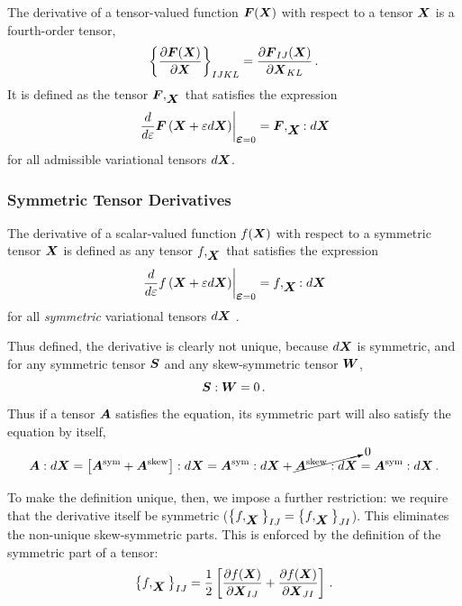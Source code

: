 \documentclass[10pt,letterpaper,oneside]{report}
\newcommand{\ten}[1]{\mbox{\boldmath $#1$}{}}
\newcommand{\scas}[1]{\mbox{{\scriptsize{${\rm{#1}}$}}}{}}
\begin{document}
The derivative of a tensor-valued function $ \ten{F} ( \ten{X} )$ with respect to a tensor $\ten{X}$ is a fourth-order tensor, 
\begin{equation}
\left\lbrace \frac{\partial \ten{F} ( \ten{X} ) }{\partial \ten{X}} \right\rbrace_{IJKL} = \frac{\partial \ten{F}_{IJ} ( \ten{X} ) }{\partial \ten{X}_{KL}} \, .
\end{equation}
It is defined as the tensor $\ten{F},_{\ten{X}}$ that satisfies the expression
\begin{equation}
\left. \frac{d}{d \varepsilon} \ten{F} \left( \ten{X} + \varepsilon d\ten{X} \right) \right|_{\ten{\varepsilon}=0} = \ten{F},_{\ten{X}} : d \ten{X}
\end{equation}
for all admissible variational tensors $d \ten{X}$. 

\subsubsection{Symmetric Tensor Derivatives}
The derivative of a scalar-valued function $f ( \ten{X} )$ with respect to a symmetric tensor $\ten{X}$ is defined as any tensor $f,_{\ten{X}}$ that satisfies the expression
\begin{equation}
\left. \frac{d}{d \varepsilon} f \left( \ten{X} + \varepsilon d\ten{X} \right) \right|_{\ten{\varepsilon}=0} = f,_{\ten{X}} : d \ten{X}
\end{equation}
for all \textit{symmetric} variational tensors $d \ten{X}$ \cite{Lebedev}.

Thus defined, the derivative is clearly not unique, because $d \ten{X}$ is symmetric, and for any symmetric tensor $\ten{S}$ and any skew-symmetric tensor $\ten{W}$,
\begin{equation}
\ten{S} : \ten{W} = 0 \, .
\end{equation}
Thus if a tensor $\ten{A}$ satisfies the equation, its symmetric part will also satisfy the equation by itself, 
\begin{equation}
\ten{A} : d \ten{X} = \left[ \ten{A}^{\scas{sym}} + \ten{A}^{\scas{skew}} \right] : d \ten{X} = \ten{A}^{\scas{sym}} : d \ten{X} + \cancelto{0}{ \ten{A}^{\scas{skew}} : d \ten{X} } = \ten{A}^{\scas{sym}} : d \ten{X} \, .
\end{equation}

To make the definition unique, then, we impose a further restriction: we require that the derivative itself be symmetric ($\left\lbrace f,_{\ten{X}} \right\rbrace_{IJ} = \left\lbrace f,_{\ten{X}} \right\rbrace_{JI} $).  This eliminates the non-unique skew-symmetric parts.  This is enforced by the definition of the symmetric part of a tensor:
\begin{equation}
\left\lbrace f,_{\ten{X}} \right\rbrace_{IJ} = \frac{1}{2} \left[ \frac{\partial f ( \ten{X} ) }{\partial \ten{X}_{IJ}} + \frac{\partial f ( \ten{X} ) }{\partial \ten{X}_{JI}} \right] \, .
\end{equation}
\end{document}
